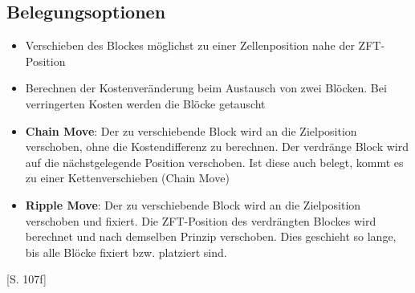         \subsection{Belegungsoptionen}\label{sec:beleungsoptionen}
            \begin{itemize}
                \item Verschieben des Blockes möglichst zu einer Zellenposition nahe der ZFT-Position
                \item Berechnen der Kostenveränderung beim Austausch von zwei Blöcken. Bei verringerten Kosten werden die Blöcke getauscht
                \item \textbf{Chain Move}: Der zu verschiebende Block wird an die Zielposition verschoben,
                    ohne die Kostendifferenz zu berechnen. Der verdränge Block wird auf die nächstgelegende Position verschoben.
                    Ist diese auch belegt, kommt es zu einer Kettenverschieben (Chain Move)
                \item \textbf{Ripple Move}: Der zu verschiebende Block wird an die Zielposition verschoben und fixiert.
                    Die ZFT-Position des verdrängten Blockes wird berechnet und nach demselben Prinzip verschoben.
                    Dies geschieht so lange, bis alle Blöcke fixiert bzw. platziert sind.
            \end{itemize}\cite{layout}[S. 107f]

            
            





       
        



